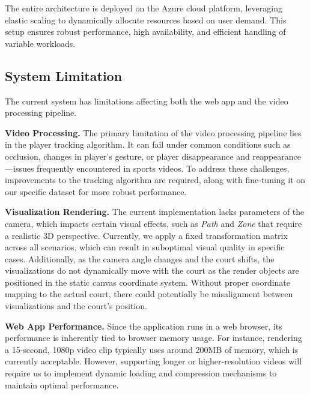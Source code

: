 The entire architecture is deployed on the Azure cloud platform, leveraging elastic scaling to dynamically allocate resources based on user demand. This setup ensures robust performance, high availability, and efficient handling of variable workloads.


\subsection{System Limitation}
The current system has limitations affecting both the web app and the video processing pipeline.

\vspace{1mm}
\noindent\textbf{Video Processing.}
The primary limitation of the video processing pipeline lies in the player tracking algorithm. It can fail under common conditions such as occlusion, changes in player's gesture, or player disappearance and reappearance—issues frequently encountered in sports videos. To address these challenges, improvements to the tracking algorithm are required, along with fine-tuning it on our specific dataset for more robust performance.

\vspace{1mm}
\noindent\textbf{Visualization Rendering.}
The current implementation lacks parameters of the camera, which impacts certain visual effects, such as \textit{Path} and \textit{Zone} that require a realistic 3D perspective. Currently, we apply a fixed transformation matrix across all scenarios, which can result in suboptimal visual quality in specific cases. Additionally, as the camera angle changes and the court shifts, the visualizations do not dynamically move with the court as the render objects are positioned in the static canvas coordinate system. Without proper coordinate mapping to the actual court, there could potentially be misalignment between visualizations and the court’s position.

\vspace{1mm}
\noindent\textbf{Web App Performance.}
Since the application runs in a web browser, its performance is inherently tied to browser memory usage. For instance, rendering a 15-second, 1080p video clip typically uses around 200MB of memory, which is currently acceptable. However, supporting longer or higher-resolution videos will require us to implement dynamic loading and compression mechanisms to maintain optimal performance.




